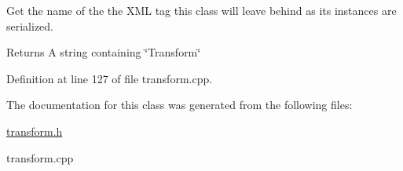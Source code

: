Get the name of the the XML tag this class will leave behind as its instances are serialized. 

\begin{DoxyReturn}{Returns}
A string containing \char`\"{}Transform\char`\"{} 
\end{DoxyReturn}


Definition at line 127 of file transform.cpp.



The documentation for this class was generated from the following files:\begin{DoxyCompactItemize}
\item 
\hyperlink{transform_8h}{transform.h}\item 
transform.cpp\end{DoxyCompactItemize}
